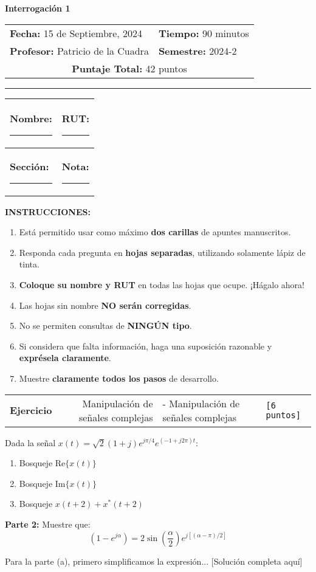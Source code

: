 \documentclass[11pt]{article}
\makeatletter
\newcommand{\respuesta}[1][4cm]{\vspace{#1}}
\newcommand{\puntos}[1]{\texttt{[#1 puntos]}}
\newenvironment{instrucciones}{%
  \begin{tcolorbox}[
    colback=black!5,
    colframe=black,
    boxrule=1pt,
    rounded corners=5pt,
    left=10pt,
    right=10pt,
    top=8pt,
    bottom=8pt
  ]
  \textbf{INSTRUCCIONES:}
  \begin{enumerate}[leftmargin=20pt]
}{%
  \end{enumerate}
  \end{tcolorbox}
}
\newcommand{\configurarprueba}[7]{
  \newcommand{\nombrePrueba}{#1}
  \newcommand{\fechaPrueba}{#2}
  \newcommand{\tiempoPrueba}{#3}
  \newcommand{\profesorPrueba}{#4}
  \newcommand{\semestrePrueba}{#5}
  \newcommand{\totalPuntos}{#6}
  \newcommand{\instruccionesPrueba}{#7}
}
\newcommand{\tituloPrueba}{%
  \begin{center}
    {\Large\bfseries\nombrePrueba}
    
    \vspace{0.5cm}
    
    \begin{tabularx}{\textwidth}{@{}X@{\hspace{2cm}}X@{}}
      \textbf{Fecha:} \fechaPrueba & \textbf{Tiempo:} \tiempoPrueba \\
      \textbf{Profesor:} \profesorPrueba & \textbf{Semestre:} \semestrePrueba \\
      \multicolumn{2}{c}{\textbf{Puntaje Total:} \totalPuntos puntos}
    \end{tabularx}
    
    \vspace{0.3cm}
    
    \rule{\textwidth}{1.5pt}
  \end{center}
  
  \vspace{0.5cm}
}
\newcounter{ejercicio}
\newenvironment{ejercicio}[2][]{%
  \stepcounter{ejercicio}
  \vspace{0.8cm}
  \noindent\begin{tabularx}{\linewidth}{@{} X r @{}}
    \textbf{Ejercicio \theejercicio} \ifx&#1&\else - #1\fi & \puntos{#2}
  \end{tabularx}
  
  \begin{tcolorbox}[
    enhanced,
    breakable,
    colback=white,
    colframe=pucgray,
    boxrule=1pt,
    rounded corners=5pt,
    left=10pt,
    right=10pt,
    top=8pt,
    bottom=8pt
  ]
}{%
  \end{tcolorbox}
  \vspace{0.5cm}
}
\newcommand{\datosEstudiante}{%
  \begin{center}
    \begin{tabularx}{0.8\textwidth}{|X|X|}
      \hline
      \textbf{Nombre:} \rule{6cm}{0.4pt} & \textbf{RUT:} \rule{4cm}{0.4pt} \\[0.5cm]
      \hline
      \textbf{Sección:} \rule{2cm}{0.4pt} & \textbf{Nota:} \rule{2cm}{0.4pt} \\[0.5cm]
      \hline
    \end{tabularx}
  \end{center}
  \vspace{0.5cm}
}
\newif\ifsoluciones
\newenvironment{solucion}{%
  \ifsoluciones
    \begin{tcolorbox}[
      enhanced,
      breakable,
      colback=black!5,
      colframe=black!50,
      boxrule=1pt,
      rounded corners=3pt,
      left=8pt,
      right=8pt,
      top=8pt,
      bottom=8pt,
      title={\textbf{SOLUCIÓN}},
      fonttitle=\bfseries
    ]
  \fi
}{%
  \ifsoluciones
    \end{tcolorbox}
  \fi
}
\makeatother
\begin{document}
\configurarprueba{
  Interrogación 1  %
}{
  15 de Septiembre, 2024  %
}{
  90 minutos  %
}{
  Patricio de la Cuadra  %
}{
  2024-2  %
}{
  42  %
}{
}

\tituloPrueba

\datosEstudiante

\begin{instrucciones}
  \item Está permitido usar como máximo \textbf{dos carillas} de apuntes manuscritos.
  \item Responda cada pregunta en \textbf{hojas separadas}, utilizando solamente lápiz de tinta.
  \item \textbf{Coloque su nombre y RUT} en todas las hojas que ocupe. ¡Hágalo ahora!
  \item Las hojas sin nombre \textbf{NO serán corregidas}.
  \item No se permiten consultas de \textbf{NINGÚN tipo}.
  \item Si considera que falta información, haga una suposición razonable y \textbf{exprésela claramente}.
  \item Muestre \textbf{claramente todos los pasos} de desarrollo.
\end{instrucciones}


\begin{ejercicio}[Manipulación de señales complejas]{6}
  Dada la señal $x(t)=\sqrt{2}(1+j)e^{j\pi/4}e^{(-1+j2\pi)t}$:
  
  \begin{enumerate}[label=\alph*)]
    \item Bosqueje Re$\{x(t)\}$
    \respuesta[2.5cm]
    
    \item Bosqueje Im$\{x(t)\}$
    \respuesta[2.5cm]
    
    \item Bosqueje $x(t+2)+x^*(t+2)$
    \respuesta[3cm]
  \end{enumerate}
  
  \textbf{Parte 2:} Muestre que:
  \[(1-e^{j\alpha})=2\sin\left(\frac{\alpha}{2}\right)e^{j[(\alpha-\pi)/2]}\]
  
  \respuesta[3cm]
  
  \begin{solucion}
    Para la parte (a), primero simplificamos la expresión...
    [Solución completa aquí]
  \end{solucion}
\end{ejercicio}
\end{document}
